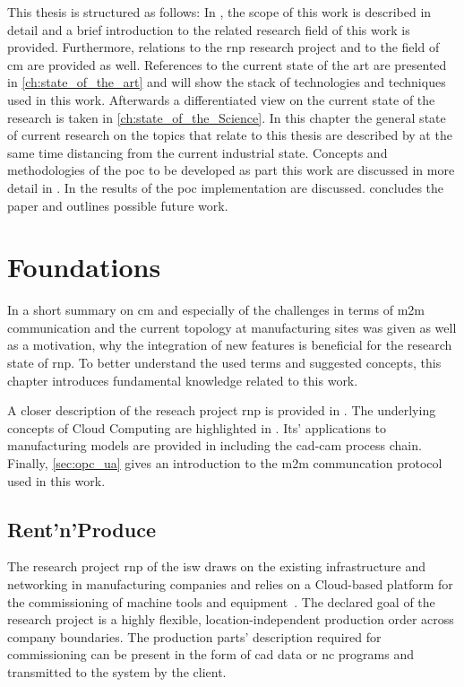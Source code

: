\documentclass[
a4paper,
twoside,
headsepline,
cleardoublepage=empty,
parskip=half,
draft=false
]{scrbook}
\begin{document}
			This thesis is structured as follows: In , the scope of this work is described in detail and a brief introduction to the related research field of this work is provided.
			Furthermore, relations to the \gls{rnp} research project and to the field of \gls{cm} are provided as well.
			References to the current state of the art are presented in \cref{ch:state_of_the_art} and will show the stack of technologies and techniques used in this work.
			Afterwards  a differentiated view on the current state of the research is taken in \cref{ch:state_of_the_Science}.
			In this chapter the general state of current research on the topics that relate to this thesis are described by at the same time distancing from the current industrial state.
			Concepts and methodologies of the \gls{poc} to be developed as part this work are discussed in more detail in .
			In  the results of the \gls{poc} implementation are discussed.
			 concludes the paper and outlines possible future work.

	\chapter{Foundations}\label{ch:foundations}

		In  a short summary on \gls{cm} and especially of the challenges in terms of \gls{m2m} communication and the current topology at manufacturing sites was given as well as a motivation, why the integration of new features is beneficial for the research state of \gls{rnp}.
		To better understand the used terms and suggested concepts, this chapter introduces fundamental knowledge related to this work.

		A closer description of the reseach project \gls{rnp} is provided in .
		The underlying concepts of Cloud Computing are highlighted in .
		Its' applications to manufacturing models are provided in  including the \gls{cad}-\gls{cam} process chain.
		Finally, \cref{sec:opc_ua} gives an introduction to the \gls{m2m} communcation protocol used in this work.

		\section{Rent'n'Produce}\label{sec:rent_n_produce}

			The research project \gls{rnp} of the \gls{isw} draws on the existing infrastructure and networking in manufacturing companies and relies on a Cloud-based platform for the commissioning of machine tools and equipment~\cite{xen.17b}. 
			The declared goal of the research project is a highly flexible, location-independent production order across company boundaries.
			The production parts' description required for commissioning can be present in the form of \gls{cad} data or \gls{nc} programs and transmitted to the system by the client.
			
\end{document}
